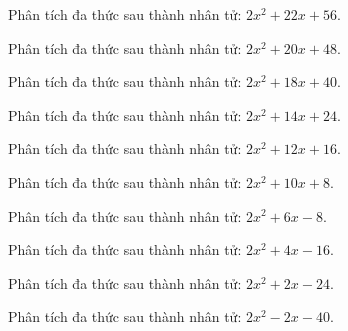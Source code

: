 \begin{bt}
	Phân tích đa thức sau thành nhân tử: $2 x^2 + 22 x + 56$.
\end{bt}
\begin{bt}
	Phân tích đa thức sau thành nhân tử: $2 x^2 + 20 x + 48$.
\end{bt}
\begin{bt}
	Phân tích đa thức sau thành nhân tử: $2 x^2 + 18 x + 40$.
\end{bt}
\begin{bt}
	Phân tích đa thức sau thành nhân tử: $2 x^2 + 14 x + 24$.
\end{bt}
\begin{bt}
	Phân tích đa thức sau thành nhân tử: $2 x^2 + 12 x + 16$.
\end{bt}
\begin{bt}
	Phân tích đa thức sau thành nhân tử: $2 x^2 + 10 x + 8$.
\end{bt}
\begin{bt}
	Phân tích đa thức sau thành nhân tử: $2 x^2 + 6 x - 8$.
\end{bt}
\begin{bt}
	Phân tích đa thức sau thành nhân tử: $2 x^2 + 4 x - 16$.
\end{bt}
\begin{bt}
	Phân tích đa thức sau thành nhân tử: $2 x^2 + 2 x - 24$.
\end{bt}
\begin{bt}
	Phân tích đa thức sau thành nhân tử: $2 x^2 - 2 x - 40$.
\end{bt}
